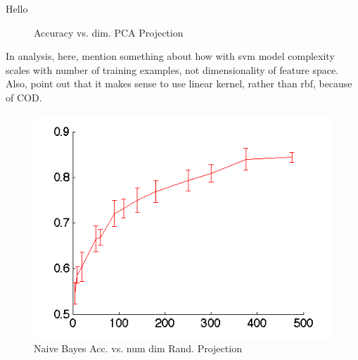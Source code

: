 Hello



\begin{figure}[!ht]
\centering
{}
\caption{Accuracy vs. dim. PCA Projection}
\label{fig:pca_acc_vs_proj_dim}
\end{figure}

In analysis, here, mention something about how with svm model complexity scales with number of training examples, not dimensionality of feature space. Also, point out that it makes sense to use linear kernel, rather than rbf, because of COD. 


\begin{center}
\begin{figure}[!ht]
\centering
\includegraphics[width=.5\textwidth]{../images/accuracy_vs_dim_randproj.png}
\caption{Naive Bayes Acc. vs. num dim Rand. Projection}
\label{fig:nb_rand_proj}
\end{figure}
\end{center}

